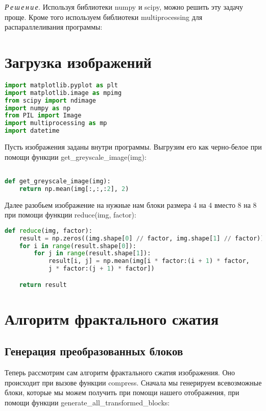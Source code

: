 \documentclass{article}
\begin{document}
 
\textit{Р\,е\,ш\,е\,н\,и\,е.}  Используя библиотеки numpy и scipy, можно решить эту задачу проще. Кроме того используем библиотеки multiprocessing для распараллеливания программы:

\section{Загрузка изображений}

\begin{lstlisting}[language=Python]
import matplotlib.pyplot as plt
import matplotlib.image as mpimg
from scipy import ndimage
import numpy as np
from PIL import Image
import multiprocessing as mp
import datetime
\end{lstlisting}

\vspace{1em}

Пусть изображения заданы внутри программы. Выгрузим его как черно-белое при помощи функции get\_greyscale\_image(img):
\begin{lstlisting}[language=Python]

def get_greyscale_image(img):
	return np.mean(img[:,:,:2], 2)
\end{lstlisting}
Далее разобьем изображение на нужные нам блоки размера 4 на 4 вместо 8 на 8 при помощи функции reduce(img, factor):
\begin{lstlisting}[language=Python]
def reduce(img, factor):
	result = np.zeros((img.shape[0] // factor, img.shape[1] // factor))
	for i in range(result.shape[0]):
		for j in range(result.shape[1]):
			result[i, j] = np.mean(img[i * factor:(i + 1) * factor,
			j * factor:(j + 1) * factor])

	return result
\end{lstlisting}
\vspace{1em}

\section{Алгоритм фрактального сжатия}

\subsection{Генерация преобразованных блоков}

Теперь рассмотрим сам алгоритм фрактального сжатия изображения. Оно происходит при вызове функции compress. Сначала мы генерируем всевозможные блоки, которые мы можем получить при помощи нашего отображения, при помощи
функции generate\_all\_transformed\_blocks:
 
\end{document}
